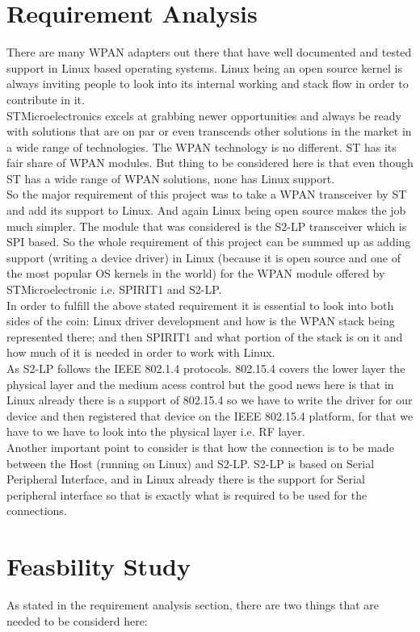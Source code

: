 \section{Requirement Analysis}
There are many WPAN adapters out there that have well documented and tested support in Linux based operating systems. Linux being an open source kernel is always inviting people to look into its internal working and stack flow in order to contribute in it.\\
STMicroelectronics excels at grabbing newer opportunities and always be ready with solutions that are on par or even transcends other solutions in the market in a wide range of technologies. The WPAN technology is no different. ST has its fair share of WPAN modules. But thing to be considered here is that even though ST has a wide range of WPAN solutions, none has Linux support.\\ 
So the major requirement of this project was to take a WPAN transceiver by ST and add its support to Linux. And again Linux being open source makes the job much simpler. The module that was considered is the S2-LP transceiver which is SPI based. So the whole requirement of this project can be summed up as adding support (writing a device driver) in Linux (because it is open source and one of the most popular OS kernels in the world) for the WPAN module offered by STMicroelectronic i.e. SPIRIT1 and S2-LP.\\
In order to fulfill the above stated requirement it is essential to look into both sides of the coin: Linux driver development and how is the WPAN stack being represented there; and then SPIRIT1 and what portion of the stack is on it and how much of it is needed in order to work with Linux.\\
As S2-LP follows the IEEE 802.1.4 protocols. 802.15.4 covers the lower layer the physical layer and the medium acess control but the good news here is that in Linux already there is a support of 802.15.4 so we have to write the driver for our device and then registered that device on the IEEE 802.15.4 platform, for that we have to we have to look into the physical layer i.e. RF layer.\\ 
Another important point to consider is that how the connection is to be made between the Host (running on Linux) and S2-LP. S2-LP is based on Serial Peripheral Interface, and in Linux already there is the support for Serial peripheral interface so that is exactly what is required to be used for the connections. 
\section{Feasbility Study}
As stated in the requirement analysis section, there are two things that are needed to be considerd here:
